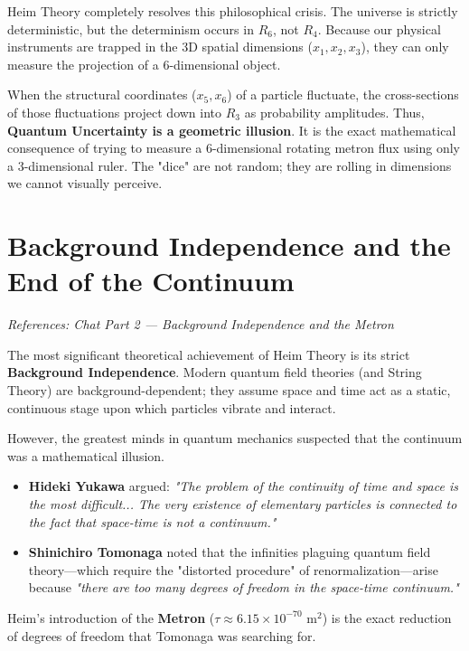 \documentclass[11pt,a4paper,oneside]{article}
\begin{document}
Heim Theory completely resolves this philosophical crisis. The universe is strictly deterministic, but the determinism occurs in $R_6$, not $R_4$. Because our physical instruments are trapped in the 3D spatial dimensions ($x_1, x_2, x_3$), they can only measure the projection of a 6-dimensional object. 

When the structural coordinates ($x_5, x_6$) of a particle fluctuate, the cross-sections of those fluctuations project down into $R_3$ as probability amplitudes. Thus, \textbf{Quantum Uncertainty is a geometric illusion}. It is the exact mathematical consequence of trying to measure a 6-dimensional rotating metron flux using only a 3-dimensional ruler. The "dice" are not random; they are rolling in dimensions we cannot visually perceive.

\section{Background Independence and the End of the Continuum}

\textit{References: Chat Part 2 — Background Independence and the Metron}

The most significant theoretical achievement of Heim Theory is its strict \textbf{Background Independence}. Modern quantum field theories (and String Theory) are background-dependent; they assume space and time act as a static, continuous stage upon which particles vibrate and interact. 

However, the greatest minds in quantum mechanics suspected that the continuum was a mathematical illusion.
\begin{itemize}
    \item \textbf{Hideki Yukawa} argued: \textit{"The problem of the continuity of time and space is the most difficult... The very existence of elementary particles is connected to the fact that space-time is not a continuum."}
    \item \textbf{Shinichiro Tomonaga} noted that the infinities plaguing quantum field theory—which require the "distorted procedure" of renormalization—arise because \textit{"there are too many degrees of freedom in the space-time continuum."}
\end{itemize}

Heim's introduction of the \textbf{Metron} ($\tau \approx 6.15 \times 10^{-70} \text{ m}^2$) is the exact reduction of degrees of freedom that Tomonaga was searching for. 
\end{document}
